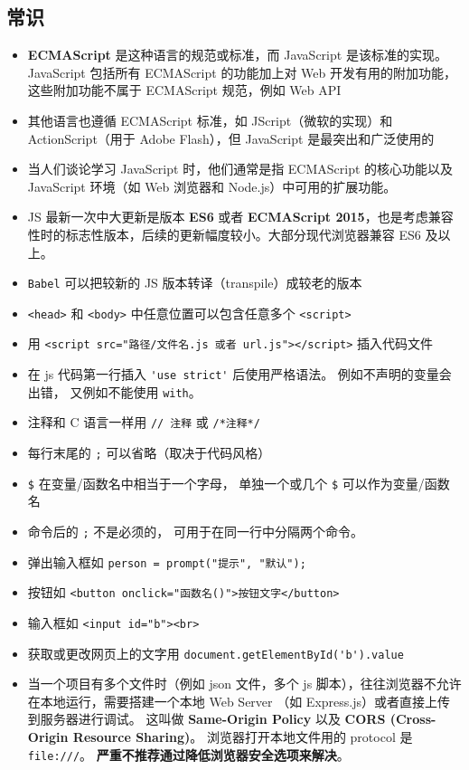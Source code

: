 \subsection{常识}
\begin{itemize}
\item \textbf{ECMAScript} 是这种语言的规范或标准，而 JavaScript 是该标准的实现。JavaScript 包括所有 ECMAScript 的功能加上对 Web 开发有用的附加功能，这些附加功能不属于 ECMAScript 规范，例如 Web API
\item 其他语言也遵循 ECMAScript 标准，如 JScript（微软的实现）和 ActionScript（用于 Adobe Flash），但 JavaScript 是最突出和广泛使用的
\item 当人们谈论学习 JavaScript 时，他们通常是指 ECMAScript 的核心功能以及 JavaScript 环境（如 Web 浏览器和 Node.js）中可用的扩展功能。
\item JS 最新一次中大更新是版本 \textbf{ES6} 或者 \textbf{ECMAScript 2015}，也是考虑兼容性时的标志性版本，后续的更新幅度较小。大部分现代浏览器兼容 ES6 及以上。
\item \verb`Babel` 可以把较新的 JS 版本转译（transpile）成较老的版本
\item \verb|<head>| 和 \verb|<body>| 中任意位置可以包含任意多个 \verb|<script>|
\item 用 \verb|<script src="路径/文件名.js 或者 url.js"></script>| 插入代码文件
\item 在 js 代码第一行插入 \verb|'use strict'| 后使用严格语法。 例如不声明的变量会出错， 又例如不能使用 \verb|with|。
\item 注释和 C 语言一样用 \verb|// 注释| 或 \verb|/*注释*/|
\item 每行末尾的 \verb`;` 可以省略（取决于代码风格）
\item \verb|$| 在变量/函数名中相当于一个字母， 单独一个或几个 \verb|$| 可以作为变量/函数名
\item 命令后的 \verb|;| 不是必须的， 可用于在同一行中分隔两个命令。
\item 弹出输入框如 \verb|person = prompt("提示", "默认");|
\item 按钮如 \verb|<button onclick="函数名()">按钮文字</button>|
\item 输入框如 \verb|<input id="b"><br>|
\item 获取或更改网页上的文字用 \verb|document.getElementById('b').value|
\item 当一个项目有多个文件时（例如 json 文件，多个 js 脚本），往往浏览器不允许在本地运行，需要搭建一个本地 Web Server （如 Express.js）或者直接上传到服务器进行调试。 这叫做 \textbf{Same-Origin Policy} 以及  \textbf{CORS (Cross-Origin Resource Sharing)}。 浏览器打开本地文件用的 protocol 是 \verb`file:///`。 \textbf{严重不推荐通过降低浏览器安全选项来解决}。
\end{itemize}

